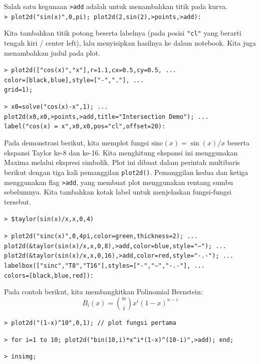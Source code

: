 \documentclass[11pt, a4paper]{article}
\newcommand{\emtcmd}[1]{\noindent\texttt{\textcolor{emtcommand}{>}\ #1}\par\smallskip}
\begin{document}
Salah satu kegunaan \texttt{>add} adalah untuk menambahkan titik pada kurva.
\emtcmd{plot2d("sin(x)",0,pi); plot2d(2,sin(2),>points,>add):}

Kita tambahkan titik potong beserta labelnya (pada posisi \texttt{"cl"} yang berarti tengah kiri / center left), lalu menyisipkan hasilnya ke dalam notebook. Kita juga menambahkan judul pada plot.

\emtcmd{plot2d(["cos(x)","x"],r=1.1,cx=0.5,cy=0.5, ... \\
\hspace*{1em} color=[black,blue],style=["-","."], ... \\
\hspace*{1em} grid=1);}
\emtcmd{x0=solve("cos(x)-x",1); ... \\
\hspace*{1em} plot2d(x0,x0,>points,>add,title="Intersection Demo"); ... \\
\hspace*{1em} label("cos(x) = x",x0,x0,pos="cl",offset=20):}

Pada demonstrasi berikut, kita memplot fungsi $\mathrm{sinc}(x)=\sin(x)/x$ beserta ekspansi Taylor ke-8 dan ke-16. Kita menghitung ekspansi ini menggunakan Maxima melalui ekspresi simbolik. Plot ini dibuat dalam perintah multibaris berikut dengan tiga kali pemanggilan \texttt{plot2d()}. Pemanggilan kedua dan ketiga menggunakan flag \texttt{>add}, yang membuat plot menggunakan rentang sumbu sebelumnya. Kita tambahkan kotak label untuk menjelaskan fungsi-fungsi tersebut.

\emtcmd{\$taylor(sin(x)/x,x,0,4)}
\emtcmd{plot2d("sinc(x)",0,4pi,color=green,thickness=2); ... \\
\hspace*{1em} plot2d(\&taylor(sin(x)/x,x,0,8),>add,color=blue,style="--"); ... \\
\hspace*{1em} plot2d(\&taylor(sin(x)/x,x,0,16),>add,color=red,style="-.-"); ... \\
\hspace*{1em} labelbox(["sinc","T8","T16"],styles=["-","--","-.-"], ... \\
\hspace*{2em} colors=[black,blue,red]):}

Pada contoh berikut, kita membangkitkan Polinomial Bernstein:
$$B_i(x) = \binom{n}{i} x^i (1-x)^{n-i}$$

\emtcmd{plot2d("(1-x)\^{}10",0,1); \textcolor{emtcomment}{// plot fungsi pertama}}
\emtcmd{for i=1 to 10; plot2d("bin(10,i)*x\^{}i*(1-x)\^{}(10-i)",>add); end;}
\emtcmd{insimg;}
\end{document}
